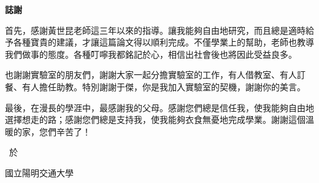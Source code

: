 \thispagestyle{empty}

\begin{center}
\Large
\textbf{誌\hspace{1cm}謝}
\end{center}

\vspace{3cm}

首先，感謝黃世昆老師這三年以來的指導。讓我能夠自由地研究，而且總是適時給予各種寶貴的建議，才讓這篇論文得以順利完成。不僅學業上的幫助，老師也教導我們做事的態度。各種叮嚀我都銘記於心，相信出社會後也將因此受益良多。

也謝謝實驗室的朋友們，謝謝大家一起分擔實驗室的工作，有人借教室、有人訂餐、有人擔任助教。特別謝謝于傑，你是我加入實驗室的契機，謝謝你的美言。

最後，在漫長的學涯中，最感謝我的父母。感謝您們總是信任我，使我能夠自由地選擇想走的路；感謝您們總是支持我，使我能夠衣食無憂地完成學業。謝謝這個溫暖的家，您們辛苦了！

\vspace{3cm}
\begin{flushright}
\studentCnName \ 於

國立陽明交通大學\ \NameofDepartmentInstituteCN

\ThesisDateTW
\end{flushright}